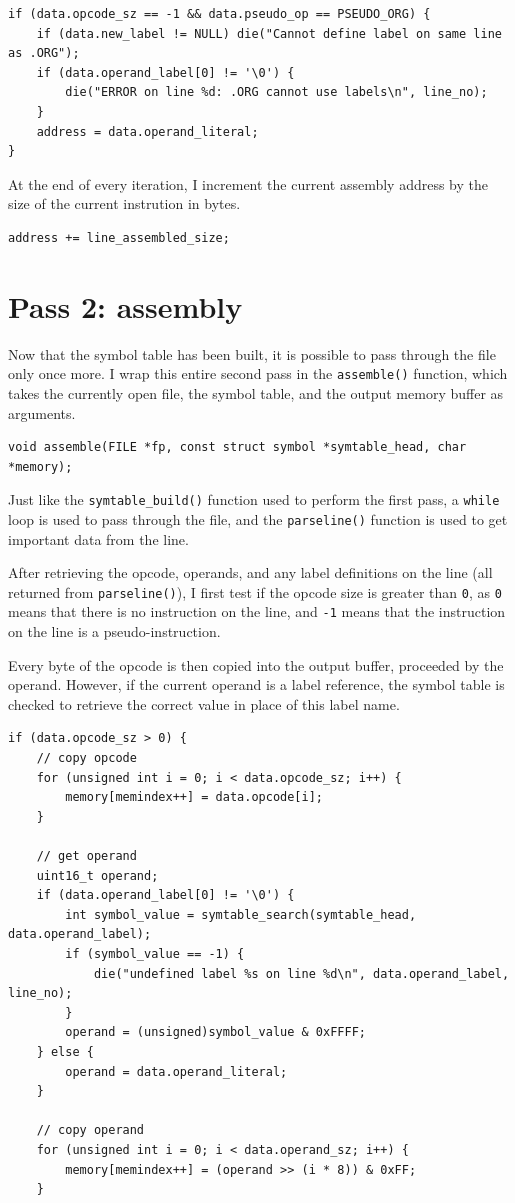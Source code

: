 \documentclass[a4paper]{report}
\begin{document}
\begin{lstlisting}
if (data.opcode_sz == -1 && data.pseudo_op == PSEUDO_ORG) {
	if (data.new_label != NULL) die("Cannot define label on same line as .ORG");
	if (data.operand_label[0] != '\0') {
		die("ERROR on line %d: .ORG cannot use labels\n", line_no);
	}
	address = data.operand_literal;
}
\end{lstlisting}

At the end of every iteration, I increment the current assembly address by the
size of the current instrution in bytes.

\begin{lstlisting}
address += line_assembled_size;
\end{lstlisting}

\section{Pass 2: assembly}

Now that the symbol table has been built, it is possible to pass through the
file only once more. I wrap this entire second pass in the \texttt{assemble()}
function, which takes the currently open file, the symbol table, and the output
memory buffer as arguments.

\begin{lstlisting}
void assemble(FILE *fp, const struct symbol *symtable_head, char *memory);
\end{lstlisting}

Just like the \texttt{symtable\_build()} function used to perform the first
pass, a \texttt{while} loop is used to pass through the file, and the
\texttt{parseline()} function is used to get important data from the line.

After retrieving the opcode, operands, and any label definitions on the line
(all returned from \texttt{parseline()}), I first test if the opcode size is
greater than \texttt{0}, as \texttt{0} means that there is no instruction on the
line, and \texttt{-1} means that the instruction on the line is a
pseudo-instruction.

Every byte of the opcode is then copied into the output buffer, proceeded by the
operand. However, if the current operand is a label reference, the symbol table
is checked to retrieve the correct value in place of this label name.

\begin{lstlisting}
if (data.opcode_sz > 0) {
	// copy opcode
	for (unsigned int i = 0; i < data.opcode_sz; i++) {
		memory[memindex++] = data.opcode[i];
	}

	// get operand
	uint16_t operand;
	if (data.operand_label[0] != '\0') {
		int symbol_value = symtable_search(symtable_head, data.operand_label);
		if (symbol_value == -1) {
			die("undefined label %s on line %d\n", data.operand_label, line_no);
		}
		operand = (unsigned)symbol_value & 0xFFFF;
	} else {
		operand = data.operand_literal;
	}

	// copy operand
	for (unsigned int i = 0; i < data.operand_sz; i++) {
		memory[memindex++] = (operand >> (i * 8)) & 0xFF;
	}
\end{lstlisting}
\end{document}
